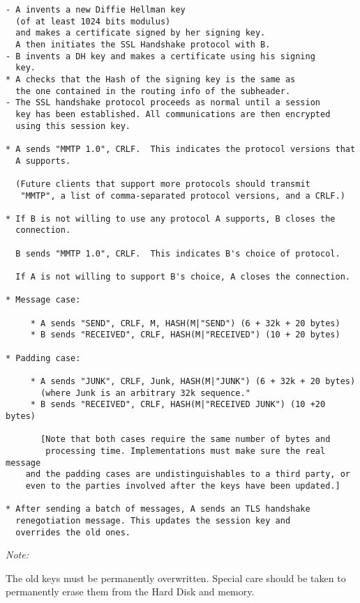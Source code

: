 \begin{verbatim}
- A invents a new Diffie Hellman key 
  (of at least 1024 bits modulus)
  and makes a certificate signed by her signing key.
  A then initiates the SSL Handshake protocol with B.
- B invents a DH key and makes a certificate using his signing
  key.
* A checks that the Hash of the signing key is the same as
  the one contained in the routing info of the subheader.
- The SSL handshake protocol proceeds as normal until a session
  key has been established. All communications are then encrypted
  using this session key.

* A sends "MMTP 1.0", CRLF.  This indicates the protocol versions that
  A supports.

  (Future clients that support more protocols should transmit
   "MMTP", a list of comma-separated protocol versions, and a CRLF.)

* If B is not willing to use any protocol A supports, B closes the 
  connection.

  B sends "MMTP 1.0", CRLF.  This indicates B's choice of protocol.

  If A is not willing to support B's choice, A closes the connection.

* Message case:

     * A sends "SEND", CRLF, M, HASH(M|"SEND") (6 + 32k + 20 bytes)
     * B sends "RECEIVED", CRLF, HASH(M|"RECEIVED") (10 + 20 bytes)

* Padding case:

     * A sends "JUNK", CRLF, Junk, HASH(M|"JUNK") (6 + 32k + 20 bytes)
       (where Junk is an arbitrary 32k sequence."
     * B sends "RECEIVED", CRLF, HASH(M|"RECEIVED JUNK") (10 +20 bytes)

       [Note that both cases require the same number of bytes and 
        processing time. Implementations must make sure the real message 
	and the padding cases are undistinguishables to a third party, or 
	even to the parties involved after the keys have been updated.]

* After sending a batch of messages, A sends an TLS handshake
  renegotiation message. This updates the session key and
  overrides the old ones.

\end{verbatim}

\emph{Note:}

The old keys must be permanently overwritten. Special care should be
taken to permanently erase them from the Hard Disk and memory. 

